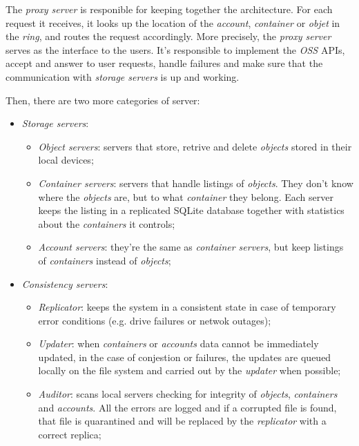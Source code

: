 \noindent
The \emph{proxy server} is responible for keeping together the architecture.
For each request it receives, it looks up the location of the \emph{account},
\emph{container} or \emph{objet} in the \emph{ring}, and routes the request
accordingly. More precisely, the \emph{proxy server} serves as the interface
to the users. It's responsible to implement the \emph{OSS} APIs, accept and
answer to user requests, handle failures and make sure that the communication
with \emph{storage servers} is up and working.

Then, there are two more categories of server:
\begin{itemize}
    \item \emph{Storage servers}:
    \begin{itemize}
        \item \emph{Object servers}: servers that store, retrive and delete
        \emph{objects} stored in their local devices;
        \item \emph{Container servers}: servers that handle listings of
        \emph{objects}. They don't know where the \emph{objects} are, but to
        what \emph{container} they belong. Each server keeps the listing in a
        replicated SQLite database together with statistics about the
        \emph{containers} it controls;
        \item \emph{Account servers}: they're the same as \emph{container servers},
        but keep listings of \emph{containers} instead of \emph{objects};
    \end{itemize}
    \item \emph{Consistency servers}:
    \begin{itemize}
        \item \emph{Replicator}: keeps the system in a consistent state in case
        of temporary error conditions (e.g. drive failures or netwok outages);
        \item \emph{Updater}: when \emph{containers} or \emph{accounts} data
        cannot be immediately updated, in the case of conjestion or failures,
        the updates are queued locally on the file system and carried out by
        the \emph{updater} when possible;
        \item \emph{Auditor}: scans local servers checking for integrity of
        \emph{objects}, \emph{containers} and \emph{accounts}. All the errors
        are logged and if a corrupted file is found, that file is quarantined
        and will be replaced by the \emph{replicator} with a correct replica;
    \end{itemize}
\end{itemize}

